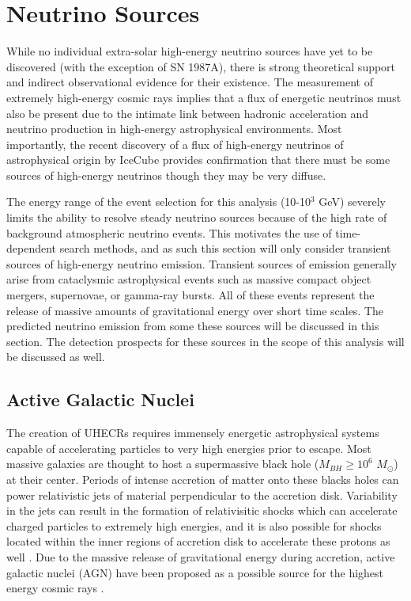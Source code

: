 \documentclass{gatech-thesis}
\begin{document}
\chapter{Neutrino Sources}
While no individual extra-solar high-energy neutrino sources have yet to be discovered (with the exception of SN 1987A), there is strong theoretical support  and indirect observational evidence for their existence. The measurement of extremely high-energy cosmic rays implies that a flux of energetic neutrinos must also be present due to the intimate link between hadronic acceleration and neutrino production in high-energy astrophysical environments. Most importantly, the recent discovery of a flux of high-energy neutrinos of astrophysical origin by IceCube \cite{2013Sci...342E...1I} provides confirmation that there must be some sources of high-energy neutrinos though they may be very diffuse.

The energy range of the event selection for this analysis (10-10$^3$ GeV) severely limits the ability to resolve steady neutrino sources because of the high rate of background atmospheric neutrino events. This motivates the use of time-dependent search methods, and as such this section will only consider transient sources of high-energy neutrino emission. Transient sources of emission generally arise from cataclysmic astrophysical events such as massive compact object mergers, supernovae, or gamma-ray bursts. All of these events represent the release of massive amounts of gravitational energy over short time scales. The predicted neutrino emission from some these sources will be discussed in this section. The detection prospects for these sources in the scope of this analysis will be discussed as well.

\section{Active Galactic Nuclei}
The creation of UHECRs requires immensely energetic astrophysical systems capable of accelerating particles to very high energies prior to escape. Most massive galaxies are thought to host a supermassive black hole ($M_{BH} \geq 10^{6}$ $M_{\odot}$) at their center. Periods of intense accretion of matter onto these blacks holes can power relativistic jets of material perpendicular to the accretion disk. Variability in the jets can result in the formation of relativisitic shocks which can accelerate charged particles to extremely high energies, and it is also possible for shocks located within the inner regions of accretion disk to accelerate these protons as well \cite{1996SSRv...75..341S}. Due to the massive release of gravitational energy during accretion, active galactic nuclei (AGN) have been proposed as a possible source for the highest energy cosmic rays \cite{1996SSRv...75..341S}.
\end{document}
